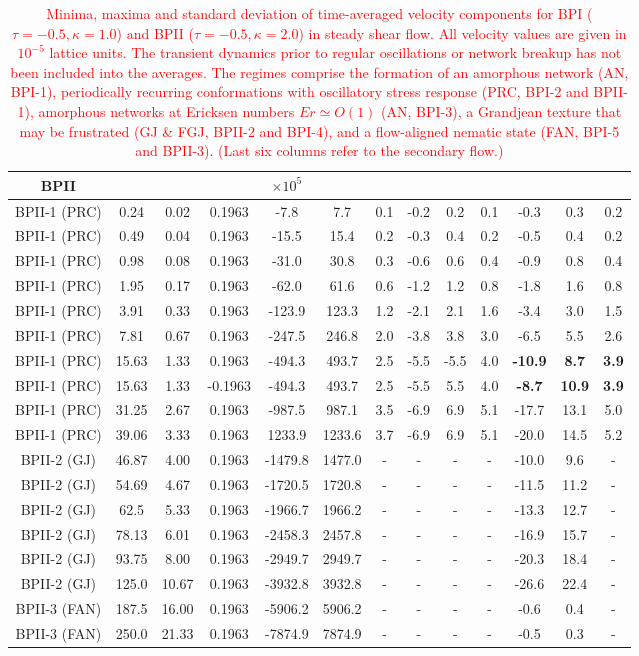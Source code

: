 \documentclass[8.5pt,twoside,twocolumn]{article}
\newcommand{\rev}[1]{{\textcolor{red}{#1}}}
\begin{document}
\begin{table}[htpb]
\begin{tabular}{|c||c|| c || c || c |c |c||c| c| c||c| c| c|}
BPII  & & & & $\times 10^5$ \\
\hline
BPII-1 (PRC) &0.24 &0.02 & 0.1963 &-7.8 &7.7 &0.1 &-0.2 &0.2 &0.1 &-0.3 &0.3 &0.2 \\
BPII-1 (PRC) &0.49 &0.04 & 0.1963 &-15.5 &15.4 &0.2 &-0.3 &0.4 &0.2 &-0.5 &0.4 &0.2 \\
BPII-1 (PRC) &0.98 &0.08 & 0.1963 &-31.0 &30.8 &0.3 &-0.6 &0.6 &0.4 &-0.9 &0.8 &0.4 \\
BPII-1 (PRC) &1.95 &0.17 & 0.1963 &-62.0 &61.6 &0.6 &-1.2 &1.2 &0.8 &-1.8 &1.6 &0.8 \\
BPII-1 (PRC) &3.91 &0.33 & 0.1963 &-123.9 &123.3 &1.2 &-2.1 &2.1 &1.6 &-3.4 &3.0 &1.5 \\
BPII-1 (PRC) &7.81 &0.67 & 0.1963 &-247.5 &246.8 &2.0 &-3.8 &3.8 &3.0 &-6.5 &5.5 &2.6 \\
BPII-1 (PRC) &15.63 &1.33 & 0.1963 &-494.3 &493.7 &2.5 &-5.5 &-5.5 &4.0 &\bf{-10.9} &\bf{8.7} &\bf{3.9} \\
BPII-1 (PRC) &15.63 &1.33 & -0.1963 &-494.3 &493.7 &2.5 &-5.5 &5.5 &4.0 &\bf{-8.7} &\bf{10.9} &\bf{3.9} \\
BPII-1 (PRC) &31.25 &2.67 & 0.1963 &-987.5 &987.1 &3.5 &-6.9 &6.9 &5.1 &-17.7 &13.1 &5.0 \\
BPII-1 (PRC) &39.06 &3.33 & 0.1963 &1233.9 &1233.6 &3.7 &-6.9 &6.9 &5.1 &-20.0 &14.5 &5.2 \\
\hline
BPII-2 (GJ) &46.87 &4.00 & 0.1963 &-1479.8 &1477.0 &- &- &- &- &-10.0 &9.6  &- \\
BPII-2 (GJ) &54.69 &4.67 & 0.1963 &-1720.5 &1720.8 &- &- &- &- &-11.5 &11.2 &- \\
BPII-2 (GJ) &62.5 &5.33 & 0.1963  &-1966.7 &1966.2 &- &- &- &- &-13.3 &12.7 &- \\
BPII-2 (GJ) &78.13 &6.01 & 0.1963 &-2458.3 &2457.8 &- &- &- &- &-16.9 &15.7 &- \\
BPII-2 (GJ) &93.75 &8.00 & 0.1963 &-2949.7 &2949.7 &- &- &- &- &-20.3 &18.4 &- \\
BPII-2 (GJ) &125.0 &10.67 &0.1963 &-3932.8 &3932.8 &- &- &- &- &-26.6 &22.4 &- \\
\hline
BPII-3 (FAN) &187.5 &16.00 & 0.1963 &-5906.2  &5906.2 &- &-  &-  &-  &-0.6 &0.4 &- \\
BPII-3 (FAN) &250.0 &21.33 & 0.1963 &-7874.9  &7874.9 &- &-  &-  &-  &-0.5 &0.3 &- \\
\hline
\end{tabular}
\caption{
\rev{Minima, maxima and standard deviation of time-averaged velocity components 
for BPI ($\tau=-0.5, \kappa=1.0$) and BPII ($\tau=-0.5, \kappa=2.0$) in steady 
shear flow. All velocity values are given in $10^{-5}$ lattice units. The transient dynamics 
prior to regular oscillations or network breakup has not been included into the averages. 
The regimes comprise the formation of an amorphous network (AN, BPI-1), 
periodically recurring conformations with oscillatory stress response (PRC, BPI-2 and BPII-1), 
amorphous networks at Ericksen numbers ${Er\simeq O(1)}$ (AN, BPI-3), 
a Grandjean texture that may be frustrated (GJ \& FGJ, BPII-2 and BPI-4),
and a flow-aligned nematic state (FAN, BPI-5 and BPII-3).
(Last six columns refer to the secondary flow.)}
}
\label{tab1}
\end{table}
\end{document}
